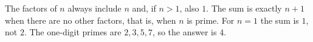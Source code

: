 The factors of $n$ always include $n$ and, if $n>1$, also $1$. The sum is exactly $n+1$ when there are no other factors, that is, when $n$ is prime. For $n=1$ the sum is $1$, not $2$. The one-digit primes are $2,3,5,7$, so the answer is $\boxed{4}$.
